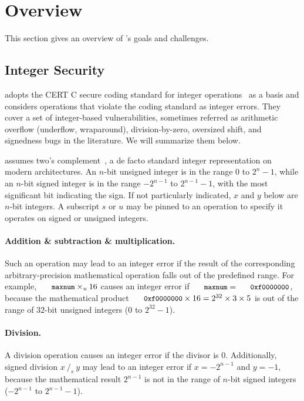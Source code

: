 \section{Overview}
\label{s:oview}

This section gives an overview of \sys's goals and challenges.

\subsection{Integer Security}
\label{s:goal}

\sys adopts the CERT C secure coding standard for integer
operations~\cite[\chapterautorefname~5]{seacord:secure-c} as a basis
and considers operations that violate the coding standard as integer
errors.  They cover a set of integer-based vulnerabilities, sometimes
referred as arithmetic overflow (underflow, wraparound), division-by-zero,
oversized shift, and signedness bugs in the literature.  We will
summarize them below.

\sys assumes two's complement~\cite[\chapterautorefname~4.2.1]{intel:vol1},
a de facto standard integer representation on modern architectures.
An $n$-bit unsigned integer is in the range $0$ to $2^n-1$, while
an $n$-bit signed integer is in the range $-2^{n-1}$ to $2^{n-1}-1$,
with the most significant bit indicating the sign.  If not particularly
indicated, $x$ and $y$ below are $n$-bit integers.  A subscript $s$
or $u$ may be pinned to an operation to specify it operates on
signed or unsigned integers.

\paragraph{Addition \& subtraction \& multiplication.}
Such an operation may lead to an integer error if the result of the
corresponding arbitrary-precision mathematical operation falls out
of the predefined range.  For example, $\cc{maxnum}\times_u 16$
causes an integer error if $\cc{maxnum} = \cc{0xf0000000}$, because
the mathematical product $\cc{0xf0000000} \times 16 = 2^{32}\times
3\times 5$ is out of the range of $32$-bit unsigned integers ($0$
to $2^{32} - 1$).

\paragraph{Division.}
A division operation causes an integer error if the divisor is 0.
Additionally, signed division $x\ /_s\ y$ may lead to an integer
error if $x = -2^{n-1}$ and $y = -1$, because the mathematical
result $2^{n-1}$ is not in the range of $n$-bit signed integers
($-2^{n-1}$ to $2^{n-1}-1$).


